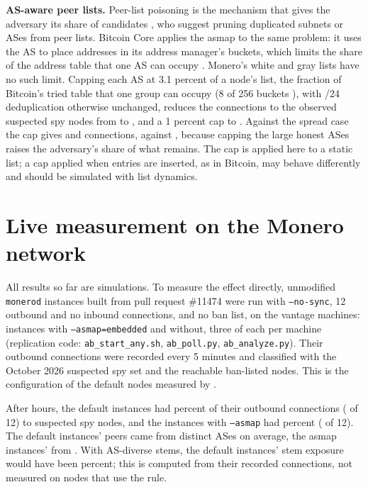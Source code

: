 \documentclass[english]{mrl}
\theoremstyle{plain}
\begin{document}
\textbf{AS-aware peer lists.} Peer-list poisoning is the mechanism that gives the adversary its share of candidates \cite{Kopyciok2026}, who suggest pruning duplicated subnets or ASes from peer lists. Bitcoin Core applies the asmap to the same problem: it uses the AS to place addresses in its address manager's buckets, which limits the share of the address table that one AS can occupy \cite{BitcoinPR16702}. Monero's white and gray lists have no such limit. Capping each AS at 3.1 percent of a node's list, the fraction of Bitcoin's tried table that one group can occupy (8 of 256 buckets \cite{BitcoinAddrman}), with /24 deduplication otherwise unchanged, reduces the connections to the observed suspected spy nodes from \plSubnetObs{} to \plCapThreeObs, and a 1 percent cap to \plCapOneObs. Against the spread case the cap gives \plCapThreeSpr{} and \plCapOneSpr{} connections, against \plSubnetSpr, because capping the large honest ASes raises the adversary's share of what remains. The cap is applied here to a static list; a cap applied when entries are inserted, as in Bitcoin, may behave differently and should be simulated with list dynamics.



\section{Live measurement on the Monero network\label{sec:live}}

All results so far are simulations. To measure the effect directly, unmodified \texttt{monerod} instances built from pull request \#11474 were run with \texttt{--no-sync}, 12 outbound and no inbound connections, and no ban list, on the \abBoxes{} vantage machines: \abInst{} instances with \texttt{--asmap=embedded} and \abInst{} without, three of each per machine (replication code: \texttt{ab\_start\_any.sh}, \texttt{ab\_poll.py}, \texttt{ab\_analyze.py}). Their outbound connections were recorded every 5 minutes and classified with the October 2026 suspected spy set and the reachable ban-listed nodes. This is the configuration of the default nodes measured by \cite{Kopyciok2026}.

After \abHours{} hours, the default instances had \abCtrlPct{} percent of their outbound connections (\abCtrlTwelve{} of 12) to suspected spy nodes, and the instances with \texttt{--asmap} had \abAsmapPct{} percent (\abAsmapTwelve{} of 12). The default instances' peers came from \abCtrlAsns{} distinct ASes on average, the asmap instances' from \abAsmapAsns. With AS-diverse stems, the default instances' stem exposure would have been \abCtrlStemDiv{} percent; this is computed from their recorded connections, not measured on nodes that use the rule.
\end{document}
